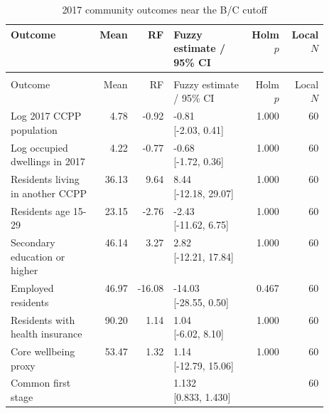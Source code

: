 \begingroup\fontsize{9.25}{11.4}\selectfont
\setlength{\tabcolsep}{3pt}\renewcommand{\arraystretch}{1.18}
\begin{longtable}{@{}>{\raggedright\arraybackslash}p{0.28\linewidth}rrp{0.24\linewidth}rr@{}}
\caption{2017 community outcomes near the B/C cutoff}\label{tab:pub_M04} \\
\toprule Outcome & Mean & RF & Fuzzy estimate / 95\% CI & Holm \(p\) & Local \(N\) \\ \midrule\endfirsthead
\multicolumn{6}{c}{\tablename\ \thetable{} -- continued} \\
\toprule Outcome & Mean & RF & Fuzzy estimate / 95\% CI & Holm \(p\) & Local \(N\) \\ \midrule\endhead
Log 2017 CCPP population & 4.78 & -0.92 & \shortstack[r]{-0.81 \\{} [-2.03, 0.41]} & 1.000 & 60 \\
Log occupied dwellings in 2017 & 4.22 & -0.77 & \shortstack[r]{-0.68 \\{} [-1.72, 0.36]} & 1.000 & 60 \\
Residents living in another CCPP & 36.13 & 9.64 & \shortstack[r]{8.44 \\{} [-12.18, 29.07]} & 1.000 & 60 \\
Residents age 15-29 & 23.15 & -2.76 & \shortstack[r]{-2.43 \\{} [-11.62, 6.75]} & 1.000 & 60 \\
Secondary education or higher & 46.14 & 3.27 & \shortstack[r]{2.82 \\{} [-12.21, 17.84]} & 1.000 & 60 \\
Employed residents & 46.97 & -16.08 & \shortstack[r]{-14.03 \\{} [-28.55, 0.50]} & 0.467 & 60 \\
Residents with health insurance & 90.20 & 1.14 & \shortstack[r]{1.04 \\{} [-6.02, 8.10]} & 1.000 & 60 \\
Core wellbeing proxy & 53.47 & 1.32 & \shortstack[r]{1.14 \\{} [-12.79, 15.06]} & 1.000 & 60 \\
Common first stage &  &  & \shortstack[r]{1.132 \\{} [0.833, 1.430]} &  & 60 \\
\bottomrule\end{longtable}
